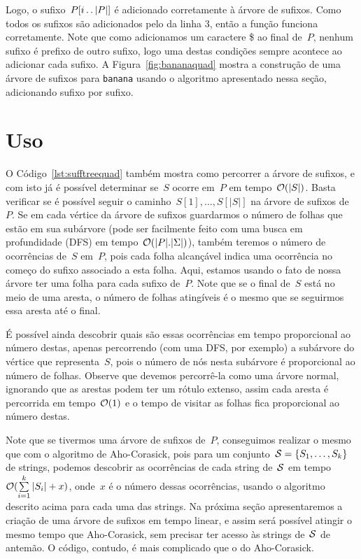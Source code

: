 Logo, o sufixo~$P[i\,.\,.\, |P|]$ é adicionado corretamente à árvore de sufixos. Como todos os sufixos são adicionados pelo  da linha 3, então a função \mbox{} funciona corretamente. Note que como adicionamos um caractere \$ ao final de~$P$, nenhum sufixo é prefixo de outro sufixo, logo uma destas condições sempre acontece ao adicionar cada sufixo. A Figura~\ref{fig:bananaquad} mostra a construção de uma árvore de sufixos para \texttt{banana} usando o algoritmo apresentado nessa seção, adicionando sufixo por sufixo.

\section{Uso}


O Código~\ref{lst:sufftreequad} também mostra como percorrer a árvore de sufixos, e com isto já é possível determinar se~$S$ ocorre em~$P$ em tempo~$\mathcal{O}(|S|)$. Basta verificar se é possível seguir o caminho~$S[1], \ldots, S[|S|]$ na árvore de sufixos de~$P$. Se em cada vértice da árvore de sufixos guardarmos o número de folhas que estão em sua subárvore (pode ser facilmente feito com uma busca em profundidade (DFS) em tempo~$\mathcal{O}(|P|.|\Sigma|)$), também teremos o número de ocorrências de~$S$ em~$P$, pois cada folha alcançável indica uma ocorrência no começo do sufixo associado a esta folha. Aqui, estamos usando o fato de nossa árvore ter uma folha para cada sufixo de~$P$. Note que se o final de~$S$ está no meio de uma aresta, o número de folhas atingíveis é o mesmo que se seguirmos essa aresta até o final.

É possível ainda descobrir quais são essas ocorrências em tempo proporcional ao número destas, apenas percorrendo (com uma DFS, por exemplo) a subárvore do vértice que representa~$S$, pois o número de nós nesta subárvore é proporcional ao número de folhas. Observe que devemos percorrê-la como uma árvore normal, ignorando que as arestas podem ter um rótulo extenso, assim cada aresta é percorrida em tempo~$\mathcal{O}(1)$ e o tempo de visitar as folhas fica proporcional ao número destas.

Note que se tivermos uma árvore de sufixos de~$P$, conseguimos realizar o mesmo que com o algoritmo de Aho-Corasick, pois para um conjunto~$\mathcal{S} = \{S_1, \ldots, S_k\}$ de strings, podemos descobrir as ocorrências de cada string de~$\mathcal{S}$ em tempo~$\mathcal{O}(\sum\limits_{i=1}^k{|S_i|} + x)$, onde~$x$ é o número dessas ocorrências, usando o algoritmo descrito acima para cada uma das strings. Na próxima seção apresentaremos a criação de uma árvore de sufixos em tempo linear, e assim será possível atingir o mesmo tempo que Aho-Corasick, sem precisar ter acesso às strings de~$\mathcal{S}$ de antemão. O código, contudo, é mais complicado que o do Aho-Corasick.







